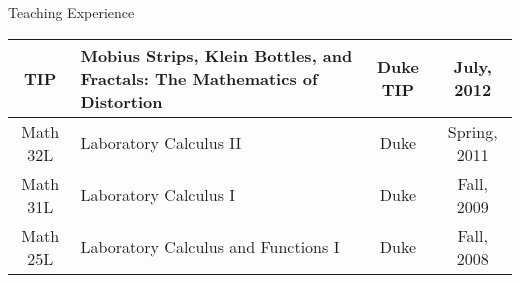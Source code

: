 \documentclass{resume} %
\begin{document}
\begin{rSection}{Teaching Experience}
\begin{center}
\begin{tabular}{cLcc}
\hline
TIP & Mobius Strips, Klein Bottles, and Fractals: The Mathematics of Distortion & Duke TIP & July, 2012
\\
\hline
Math 32L & Laboratory Calculus II & Duke & Spring, 2011
\\
\hline
Math 31L & Laboratory Calculus I & Duke & Fall, 2009
\\
\hline
Math 25L & Laboratory Calculus and Functions I & Duke & Fall, 2008
\\
\hline
\end{tabular}
\end{center}





\end{rSection}


\end{document}
